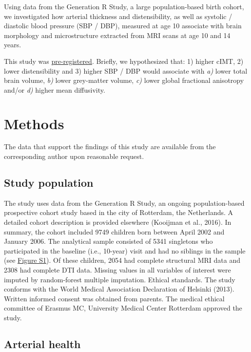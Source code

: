 \documentclass[
  letterpaper,
  DIV=11,
  numbers=noendperiod]{scrreport}
\begin{document}
Using data from the Generation R Study, a large population-based birth
cohort, we investigated how arterial thickness and distensibility, as
well as systolic / diastolic blood pressure (SBP / DBP), measured at age
10 associate with brain morphology and microstructure extracted from MRI
scans at age 10 and 14 years.

This study was \href{https://osf.io/ryc7e}{pre-registered}. Briefly, we
hypothesized that: 1) higher cIMT, 2) lower distensibility and 3) higher
SBP / DBP would associate with \emph{a)} lower total brain volume,
\emph{b)} lower grey-matter volume, \emph{c)} lower global fractional
anisotropy and/or \emph{d)} higher mean diffusivity.

\section{Methods}\label{methods-5}

The data that support the findings of this study are available from the
corresponding author upon reasonable request.

\subsection{Study population}\label{study-population}

The study uses data from the Generation R Study, an ongoing
population-based prospective cohort study based in the city of
Rotterdam, the Netherlands. A detailed cohort description is provided
elsewhere (Kooijman et al., 2016). In summary, the cohort included 9749
children born between April 2002 and January 2006. The analytical sample
consisted of 5341 singletons who participated in the baseline (i.e.,
10-year) visit and had no siblings in the sample (see
\href{https://osf.io/2f4sg}{Figure S1}). Of these children, 2054 had
complete structural MRI data and 2308 had complete DTI data. Missing
values in all variables of interest were imputed by random-forest
multiple imputation. Ethical standards. The study conforms with the
World Medical Association Declaration of Helsinki (2013). Written
informed consent was obtained from parents. The medical ethical
committee of Erasmus MC, University Medical Center Rotterdam approved
the study.

\subsection{Arterial health}\label{arterial-health}
\end{document}
